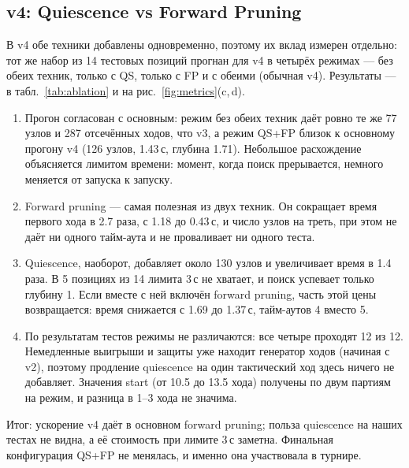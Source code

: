 \documentclass[a4paper,10pt,twocolumn]{article}
\newenvironment{points}{\begin{enumerate}[label=(\arabic*),leftmargin=*,itemsep=2pt,topsep=3pt]}{\end{enumerate}}
\begin{document}
\subsection{v4: Quiescence vs Forward Pruning}\label{sec:ablation}
В v4 обе техники добавлены одновременно, поэтому их вклад измерен отдельно: тот же набор из 14 тестовых позиций прогнан для v4 в четырёх режимах --- без обеих техник, только с QS, только с FP и с обеими (обычная v4). Результаты --- в табл.~\ref{tab:ablation} и на рис.~\ref{fig:metrics}(c,\,d).
\begin{points}
\item Прогон согласован с основным: режим без обеих техник даёт ровно те же 77 узлов и 287 отсечённых ходов, что v3, а режим QS+FP близок к основному прогону v4 (126 узлов, 1.43\,с, глубина 1.71). Небольшое расхождение объясняется лимитом времени: момент, когда поиск прерывается, немного меняется от запуска к запуску.
\item Forward pruning --- самая полезная из двух техник. Он сокращает время первого хода в 2.7 раза, с 1.18 до 0.43\,с, и число узлов на треть, при этом не даёт ни одного тайм-аута и не проваливает ни одного теста.
\item Quiescence, наоборот, добавляет около 130 узлов и увеличивает время в 1.4 раза. В 5 позициях из 14 лимита 3\,с не хватает, и поиск успевает только глубину 1. Если вместе с ней включён forward pruning, часть этой цены возвращается: время снижается с 1.69 до 1.37\,с, тайм-аутов 4 вместо 5.
\item По результатам тестов режимы не различаются: все четыре проходят 12 из 12. Немедленные выигрыши и защиты уже находит генератор ходов (начиная с v2), поэтому продление quiescence на один тактический ход здесь ничего не добавляет. Значения start (от 10.5 до 13.5 хода) получены по двум партиям на режим, и разница в 1--3 хода не значима.
\end{points}
Итог: ускорение v4 даёт в основном forward pruning; польза quiescence на наших тестах не видна, а её стоимость при лимите 3\,с заметна. Финальная конфигурация QS+FP не менялась, и именно она участвовала в турнире.
\end{document}
